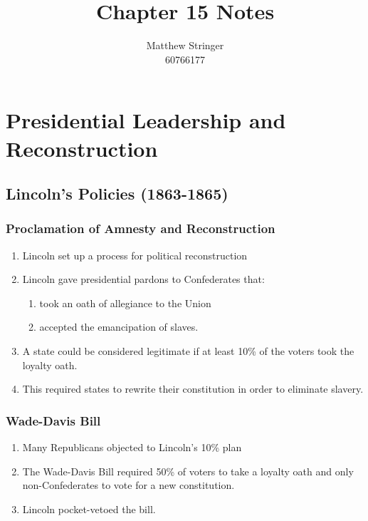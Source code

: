 \documentclass[12pt]{article} %
\title{Chapter 15 Notes} %
\author{Matthew Stringer \\ 60766177} %
\begin{document}
\maketitle
\tableofcontents
\newpage

\section{Presidential Leadership and Reconstruction}
\subsection{Lincoln's Policies (1863-1865)}
\subsubsection{Proclamation of Amnesty and Reconstruction}
\begin{enumerate}
	\item Lincoln set up a process for political reconstruction
	\item Lincoln gave presidential pardons to Confederates that:
	\begin{enumerate}
		\item took an oath of allegiance to the Union
		\item accepted the emancipation of slaves.
	\end{enumerate}
	\item A state could be considered legitimate if at least 10\% of the voters took the loyalty oath.
	\item This required states to rewrite their constitution in order to eliminate slavery.
\end{enumerate}

\subsubsection{Wade-Davis Bill}
\begin{enumerate}
	\item Many Republicans objected to Lincoln's 10\% plan
	\item The Wade-Davis Bill required 50\% of voters to take a loyalty oath and only non-Confederates
		to vote for a new constitution.
	\item Lincoln pocket-vetoed the bill.
\end{enumerate}
\end{document}
